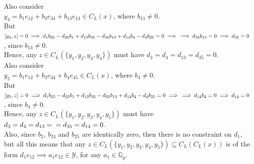 \documentclass{article}
\begin{document}
Also consider\\
$y_4=b_1e_{12}+b_3e_{34}+b_{13}e_{13}\in{C}_L(x)$, where $b_{13}\neq{0}$.\\
But $[y_4,z]=0\implies{d_1b_{25}-d_{25}b_1+d_{13}b_{35}-d_{35}b_{13}+d_{14}b_4-d_4b_{25}=0}\implies\\\implies{d_{35}b_{13}=0}\implies{d_{35}=0}$, since $b_{13}\neq{0}$.\\
Hence, any $z\in{C}_L(\{y_1,y_2,y_3,y_4\})$ must have $d_3=d_4=d_{13}=d_{35}=0$.\\
Also consider\\
$y_5=b_1e_{12}+b_3e_{34}+b_4e_{45}\in{C}_L(x)$, where $b_4\neq{0}$.\\
But $[y_5,z]=0\implies{d_1b_{25}-d_{25}b_1+d_{13}b_{35}-d_{35}b_{13}+d_{14}b_4-d_4b_{25}=0}\implies\\\implies{d_{14}b_4=0}\implies{d_{14}=0}$, since $b_4\neq{0}$.\\
Hence, any $z\in{C}_L(\{y_1,y_2,y_3,y_4,y_5\})$ must have $d_3=d_4=d_{13}=\\=d_{35}=d_{14}=0$.\\
Also, since $b_2$, $b_{24}$ and $b_{25}$ are identically zero, then there is no constraint on $d_1$, but all this means that any $z\in{C}_L(\{y_1,y_2,y_3,y_4,y_5\})\subseteq{C}_L(C_L(x))$ is of the form $d_1e_{12}\implies{a_1e_{12}}\in\mathcal{Y}$, for any $a_1\in\mathbb{Q}_p$.\\
\end{document}
